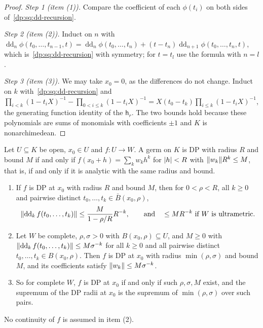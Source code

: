 \begin{proof}
\emph{Step 1 (item (1)).} Compare the coefficient of each $\phi(t_i)$ on both sides of~\eqref{dp:sq:dd-recursion}.

\emph{Step 2 (item (2)).} Induct on $n$ with $\operatorname{dd}_n\phi(t_0,\dots,t_{n-1},t)=\operatorname{dd}_n\phi(t_0,\dots,t_n)+(t-t_n)\operatorname{dd}_{n+1}\phi(t_0,\dots,t_n,t)$, which is~\eqref{dp:sq:dd-recursion} with symmetry; for $t=t_l$ use the formula with $n=l$.

\emph{Step 3 (item (3)).} We may take $x_0=0$, as the differences do not change. Induct on $k$ with~\eqref{dp:sq:dd-recursion} and $\prod_{i<k}(1-t_iX)^{-1}-\prod_{0<i\le k}(1-t_iX)^{-1}=X(t_0-t_k)\prod_{i\le k}(1-t_iX)^{-1}$, the generating function identity of the $\mathsf h_r$. The two bounds hold because these polynomials are sums of monomials with coefficients $\pm1$ and $K$ is nonarchimedean.
\end{proof}

\begin{theorem}\label{dp:thm:divided-one}
Let $U\subseteq K$ be open, $x_0\in U$ and $f\colon U\to W$. A germ on $K$ is DP with radius $R$ and bound $M$ if and only if $f(x_0+h)=\sum_kw_kh^k$ for $\lvert h\rvert<R$ with $\lVert w_k\rVert R^k\le M$, that is, if and only if it is analytic with the same radius and bound.
\begin{enumerate}
\item If $f$ is DP at $x_0$ with radius $R$ and bound $M$, then for $0<\rho<R$, all $k\ge0$ and pairwise distinct $t_0,\dots,t_k\in\bar B(x_0,\rho)$,
\begin{equation}\label{dp:sq:one-variable-bound}
 \lVert \operatorname{dd}_kf(t_0,\dots,t_k)\rVert\le\frac{M}{1-\rho/R}R^{-k},\qquad\text{and}\quad\le MR^{-k}\text{ if $W$ is ultrametric}.
\end{equation}
\item Let $W$ be complete, $\rho,\sigma>0$ with $B(x_0,\rho)\subseteq U$, and $M\ge0$ with $\lVert \operatorname{dd}_kf(t_0,\dots,t_k)\rVert\le M\sigma^{-k}$ for all $k\ge0$ and all pairwise distinct $t_0,\dots,t_k\in B(x_0,\rho)$. Then $f$ is DP at $x_0$ with radius $\min(\rho,\sigma)$ and bound $M$, and its coefficients satisfy $\lVert w_k\rVert\le M\sigma^{-k}$.
\item So for complete $W$, $f$ is DP at $x_0$ if and only if such $\rho,\sigma,M$ exist, and the supremum of the DP radii at $x_0$ is the supremum of $\min(\rho,\sigma)$ over such pairs.
\end{enumerate}
No continuity of $f$ is assumed in item \textup{(2)}.
\end{theorem}

